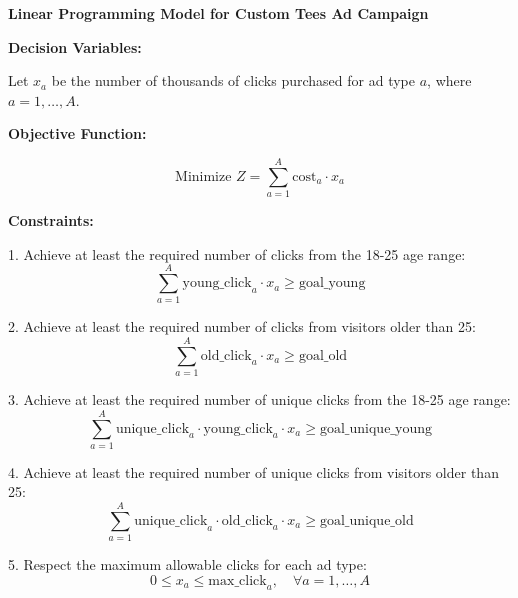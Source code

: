 \documentclass{article}
\begin{document}
\textbf{Linear Programming Model for Custom Tees Ad Campaign}

\textbf{Decision Variables:}

Let \( x_a \) be the number of thousands of clicks purchased for ad type \( a \), where \( a = 1, \ldots, A \).

\textbf{Objective Function:}

\[
\text{Minimize } Z = \sum_{a=1}^{A} \text{cost}_a \cdot x_a
\]

\textbf{Constraints:}

1. Achieve at least the required number of clicks from the 18-25 age range:
   \[
   \sum_{a=1}^{A} \text{young\_click}_{a} \cdot x_a \geq \text{goal\_young}
   \]

2. Achieve at least the required number of clicks from visitors older than 25:
   \[
   \sum_{a=1}^{A} \text{old\_click}_{a} \cdot x_a \geq \text{goal\_old}
   \]

3. Achieve at least the required number of unique clicks from the 18-25 age range:
   \[
   \sum_{a=1}^{A} \text{unique\_click}_{a} \cdot \text{young\_click}_{a} \cdot x_a \geq \text{goal\_unique\_young}
   \]

4. Achieve at least the required number of unique clicks from visitors older than 25:
   \[
   \sum_{a=1}^{A} \text{unique\_click}_{a} \cdot \text{old\_click}_{a} \cdot x_a \geq \text{goal\_unique\_old}
   \]

5. Respect the maximum allowable clicks for each ad type:
   \[
   0 \leq x_a \leq \text{max\_click}_{a}, \quad \forall a = 1, \ldots, A
   \]
\end{document}
